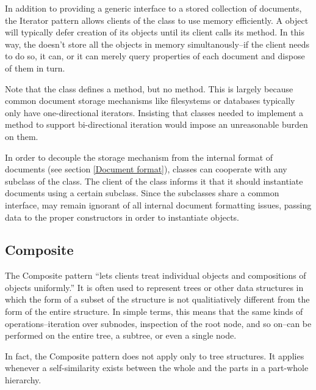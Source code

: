 In addition to providing a generic interface to a stored collection of
documents, the Iterator pattern allows clients of the  class
to use memory efficiently.  A  object will typically defer
creation of its  objects until its client calls its
 method.  In this way, the  doesn't store all
the  objects in memory simultanously--if the client needs to do so,
it can, or it can merely query properties of each document and dispose
of them in turn.

Note that the  class defines a  method,
but no  method.  This is largely because common
document storage mechanisms like filesystems or databases typically
only have one-directional iterators.  Insisting that
 classes needed to implement a 
method to support bi-directional iteration would impose an
unreasonable burden on them.

In order to decouple the storage mechanism from the internal format of
documents (see section \ref{Document format}), 
classes can cooperate with any subclass of the  class.
The client of the  class informs it that it should
instantiate documents using a certain  subclass.
Since the  subclasses share a common interface, 
may remain ignorant of all internal document formatting issues,
passing data to the proper constructors in order to instantiate
 objects.


\subsection{Composite}

The Composite pattern ``lets clients treat individual objects and
compositions of objects uniformly.'' \cite[p. 163]{gamma:95} It is
often used to represent trees or other data structures in which the
form of a subset of the structure is not qualitiatively different from
the form of the entire structure.  In simple terms, this means that
the same kinds of operations--iteration over subnodes, inspection of
the root node, and so on--can be performed on the entire tree, a
subtree, or even a single node.

In fact, the Composite pattern does not apply only to tree
structures.  It applies whenever a self-similarity exists between the
whole and the parts in a part-whole hierarchy.

